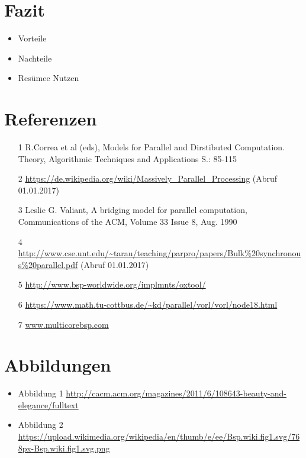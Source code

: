 \documentclass[a4paper,10pt]{scrartcl}
\begin{document}
\section{Fazit}
\begin{itemize}
 \item Vorteile
 \item Nachteile
 \item Resümee Nutzen
\end{itemize}
\section{Referenzen}
\begin{itemize}
\item [1] R.Correa et al (eds), Models for Parallel and Dirstibuted Computation. Theory, Algorithmic Techniques and Applications S.: 85-115
\item [2] \url{https://de.wikipedia.org/wiki/Massively_Parallel_Processing} (Abruf 01.01.2017)
\item [3] Leslie G. Valiant, A bridging model for parallel computation, Communications of the ACM, Volume 33 Issue 8, Aug. 1990 
\item [4] \url{http://www.cse.unt.edu/~tarau/teaching/parpro/papers/Bulk%20synchronous%20parallel.pdf} (Abruf 01.01.2017)
\item [5] \url{http://www.bsp-worldwide.org/implmnts/oxtool/}
\item [6] \url{https://www.math.tu-cottbus.de/~kd/parallel/vorl/vorl/node18.html}
\item [7] \url{www.multicorebsp.com}
\end{itemize}
\section{Abbildungen}
\begin{itemize}
\item Abbildung 1 \url{http://cacm.acm.org/magazines/2011/6/108643-beauty-and-elegance/fulltext}
\item Abbildung 2 \url{https://upload.wikimedia.org/wikipedia/en/thumb/e/ee/Bsp.wiki.fig1.svg/768px-Bsp.wiki.fig1.svg.png}
       
\end{itemize}
\end{document}
